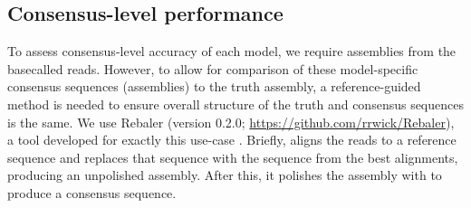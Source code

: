 \begin{table}
\centering
{}
\caption{Relative read length for the \mtb{}-specific basecalling model \tubby{} compared with the default \guppy{} model on the test data. Relative read length is the length of the aligned part of the read, divided by the total length of the read. Version indicates the \guppy{} version used for the basecalling prior to, and after, training. Count refers to the number of reads evaluated. std=standard deviation.}
\label{tab:test-read-rel-len}
\end{table}

\subsection{Consensus-level performance}

To assess consensus-level accuracy of each model, we require assemblies from the basecalled reads. However, to allow for comparison of these model-specific consensus sequences (assemblies) to the truth assembly, a reference-guided method is needed to ensure overall structure of the truth and consensus sequences is the same. We use Rebaler (version 0.2.0; \url{https://github.com/rrwick/Rebaler}), a tool developed for exactly this use-case \cite{wick2019}. Briefly,  aligns the reads to a reference sequence and replaces that sequence with the sequence from the best alignments, producing an unpolished assembly. After this, it polishes the assembly with  to produce a consensus sequence. 

